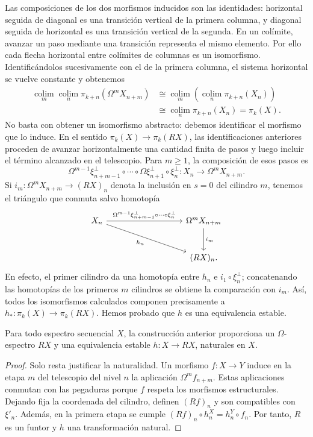 Las composiciones de los dos morfismos inducidos son las identidades: horizontal seguida de diagonal es una transición vertical de la primera columna, y diagonal seguida de horizontal es una transición vertical de la segunda. En un colímite, avanzar un paso mediante una transición representa el mismo elemento. Por ello cada flecha horizontal entre colímites de columnas es un isomorfismo. Identificándolos sucesivamente con el de la primera columna, el sistema horizontal se vuelve constante y obtenemos
\[
\begin{aligned}
\operatorname*{colim}_m\operatorname*{colim}_n
\pi_{k+n}(\Omega^mX_{n+m})
&\cong\operatorname*{colim}_m
\left(\operatorname*{colim}_n\pi_{k+n}(X_n)\right)\\
&\cong\operatorname*{colim}_n\pi_{k+n}(X_n)
=\pi_k(X).
\end{aligned}
\]
No basta con obtener un isomorfismo abstracto: debemos identificar el morfismo que lo induce. En el sentido $\pi_k(X)\to\pi_k(RX)$, las identificaciones anteriores proceden de avanzar horizontalmente una cantidad finita de pasos y luego incluir el término alcanzado en el telescopio. Para $m\ge1$, la composición de esos pasos es
\[
\Omega^{m-1}\xi_{n+m-1}^{\perp}\circ\cdots
\circ\Omega\xi_{n+1}^{\perp}\circ\xi_n^{\perp}
\colon X_n\longrightarrow\Omega^mX_{n+m}.
\]
Si $i_m\colon\Omega^mX_{n+m}\to(RX)_n$ denota la inclusión en $s=0$ del cilindro $m$, tenemos el triángulo que conmuta salvo homotopía
\[
\begin{tikzcd}[column sep=9em,row sep=large]
X_n
\arrow[r,"\Omega^{m-1}\xi_{n+m-1}^{\perp}\circ\cdots\circ\xi_n^{\perp}"]
\arrow[dr,"h_n"']
& \Omega^mX_{n+m} \arrow[d,"i_m"]\\
& (RX)_n.
\end{tikzcd}
\]
En efecto, el primer cilindro da una homotopía entre $h_n$ e $i_1\circ\xi_n^{\perp}$; concatenando las homotopías de los primeros $m$ cilindros se obtiene la comparación con $i_m$. Así, todos los isomorfismos calculados componen precisamente a $h_*\colon\pi_k(X)\to\pi_k(RX)$. Hemos probado que $h$ es una equivalencia estable.

\begin{prop}\label{prop:c10-reemplazo-omega}
Para todo espectro secuencial $X$, la construcción anterior proporciona un $\Omega$-espectro $RX$ y una equivalencia estable $h\colon X\to RX$, naturales en $X$.
\end{prop}
\begin{proof}
Solo resta justificar la naturalidad. Un morfismo $f\colon X\to Y$ induce en la etapa $m$ del telescopio del nivel $n$ la aplicación $\Omega^m f_{n+m}$. Estas aplicaciones conmutan con las pegaduras porque $f$ respeta los morfismos estructurales. Dejando fija la coordenada del cilindro, definen $(Rf)_n$ y son compatibles con $\xi'_n$. Además, en la primera etapa se cumple $(Rf)_n\circ h_n^X=h_n^Y\circ f_n$. Por tanto, $R$ es un funtor y $h$ una transformación natural.
\end{proof}

